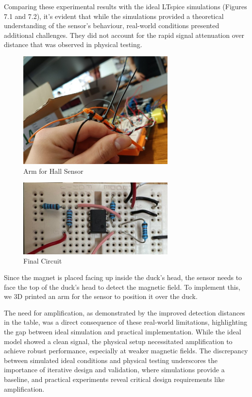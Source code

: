 Comparing these experimental results with the ideal LTspice simulations (Figures 7.1 and 7.2), it's evident that while the simulations provided a theoretical understanding of the sensor's behaviour, real-world conditions presented additional challenges. They did not account for the rapid signal attenuation over distance that was observed in physical testing.
\begin{figure}[H]
    \centering
    \includegraphics[width=0.7\textwidth]{subpages/images/magnet_arm_irl.png}
    \caption{Arm for Hall Sensor}
    \label{fig:magnet_arm}
\end{figure}
\begin{figure}[H]
    \centering
    \includegraphics[width=0.7\textwidth]{subpages/images/magnet_circuit_irl.png}
    \caption{Final Circuit}
    \label{fig:circuit_irl}
\end{figure}
Since the magnet is placed facing up inside the duck’s head, the sensor needs to face the top of the duck’s head to detect the magnetic field. To implement this, we 3D printed an arm for the sensor to position it over the duck.

The need for amplification, as demonstrated by the improved detection distances in the table, was a direct consequence of these real-world limitations, highlighting the gap between ideal simulation and practical implementation. While the ideal model showed a clean signal, the physical setup necessitated amplification to achieve robust performance, especially at weaker magnetic fields. The discrepancy between simulated ideal conditions and physical testing underscores the importance of iterative design and validation, where simulations provide a baseline, and practical experiments reveal critical design requirements like amplification.